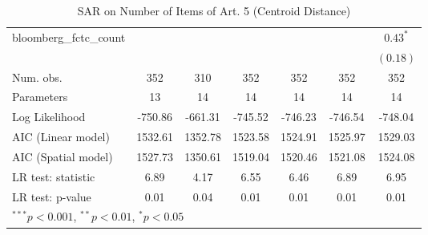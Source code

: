 \begin{table}[!h]
\begin{center}
\begin{tabular}{l c c c c c c }
bloomberg\_fctc\_count  &              &             &              &              &              & $0.43^{*}$   \\
                        &              &             &              &              &              & $(0.18)$     \\
\midrule
Num. obs.               & 352          & 310         & 352          & 352          & 352          & 352          \\
Parameters              & 13           & 14          & 14           & 14           & 14           & 14           \\
Log Likelihood          & -750.86      & -661.31     & -745.52      & -746.23      & -746.54      & -748.04      \\
AIC (Linear model)      & 1532.61      & 1352.78     & 1523.58      & 1524.91      & 1525.97      & 1529.03      \\
AIC (Spatial model)     & 1527.73      & 1350.61     & 1519.04      & 1520.46      & 1521.08      & 1524.08      \\
LR test: statistic      & 6.89         & 4.17        & 6.55         & 6.46         & 6.89         & 6.95         \\
LR test: p-value        & 0.01         & 0.04        & 0.01         & 0.01         & 0.01         & 0.01         \\
\bottomrule
\multicolumn{7}{l}{\scriptsize{$^{***}p<0.001$, $^{**}p<0.01$, $^*p<0.05$}}
\end{tabular}
\caption{SAR on Number of Items of Art. 5 (Centroid Distance)}
\label{table:coefficients}
\end{center}
\end{table}
